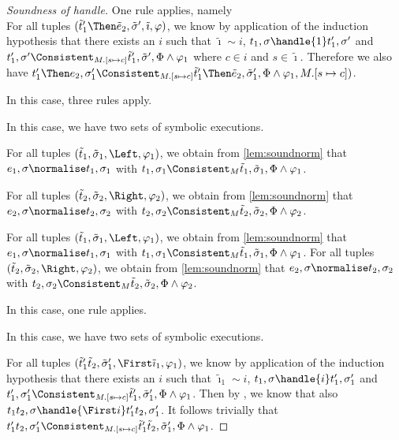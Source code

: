 \begin{proof}[Soundness of handle]
{One rule applies, namely \\
For all tuples $(\tilde{t}_1'\Then\tilde{e}_2,\tilde{\sigma}',\tilde{\imath},\phi)$, we know by application of the induction hypothesis that
there exists an $i$ such that $\tilde{\imath}\sim i$, $t_1,\sigma\handle{1}t_1',\sigma'$ and
$t_1',\sigma'\Consistent_{M.[s\mapsto c]}\tilde{t}_1',\tilde{\sigma}',\Phi\land\phi_1$ where $c\in i$ and $s\in \tilde{\imath}$.
Therefore we also have $t_1'\Then e_2,\sigma_1'\Consistent_{M.[s\mapsto c]}\tilde{t}_1'\Then \tilde{e}_2,\tilde{\sigma}_1',\Phi\land\phi_1,M.[s\mapsto c])$.
}

 {
In this case, three rules apply.\\
   {
   In this case, we have two sets of symbolic executions.

   For all tuples $(\tilde{t}_1,\tilde{\sigma}_1,\Left,\phi_1)$,
   we obtain from \cref{lem:soundnorm} that $e_1,\sigma\normalise t_1,\sigma_1$ with
   $t_1,\sigma_1\Consistent_M\tilde{t}_1,\tilde{\sigma}_1,\Phi\land\phi_1$.

   For all tuples $(\tilde{t}_2,\tilde{\sigma}_2,\Right,\phi_2)$,
   we obtain from \cref{lem:soundnorm} that $e_2,\sigma\normalise t_2,\sigma_2$ with
   $t_2,\sigma_2\Consistent_M\tilde{t}_2,\tilde{\sigma}_2,\Phi\land\phi_2$.
   }
%
  {
  For all tuples $(\tilde{t}_1,\tilde{\sigma}_1,\Left,\phi_1)$,
  we obtain from \cref{lem:soundnorm} that $e_1,\sigma\normalise t_1,\sigma_1$ with
  $t_1,\sigma_1\Consistent_M\tilde{t}_1,\tilde{\sigma}_1,\Phi\land\phi_1$.
%
}
  {
  For all tuples $(\tilde{t}_2,\tilde{\sigma}_2,\Right,\phi_2)$,
  we obtain from \cref{lem:soundnorm} that $e_2,\sigma\normalise t_2,\sigma_2$ with
  $t_2,\sigma_2\Consistent_M\tilde{t}_2,\tilde{\sigma}_2,\Phi\land\phi_2$.
  }
 }
%
{
In this case, one rule applies. 

In this case, we have two sets of symbolic executions.

  For all tuples $(\tilde{t}_1'\And\tilde{t}_2,\tilde{\sigma}_1',\First \tilde{\imath}_1,\phi_1)$,
  we know by application of the induction hypothesis that there exists an $i$ such that
  $\tilde{\imath}_1\sim i$, $t_1,\sigma\handle{i}t_1',\sigma_1'$ and
  $t_1',\sigma_1'\Consistent_{M.[s\mapsto c]}\tilde{t}_1',\tilde{\sigma}_1',\Phi\land\phi_1$.
  Then by , we know that also $t_1\And t_2,\sigma\handle{\First i}t_1'\And t_2,\sigma_1'$.
  It follows trivially that $t_1'\And t_2,\sigma_1'\Consistent_{M.[s\mapsto c]}\tilde{t}_1'\And \tilde{t}_2,\tilde{\sigma}_1',\Phi\land\phi_1$.

}
\end{proof}
